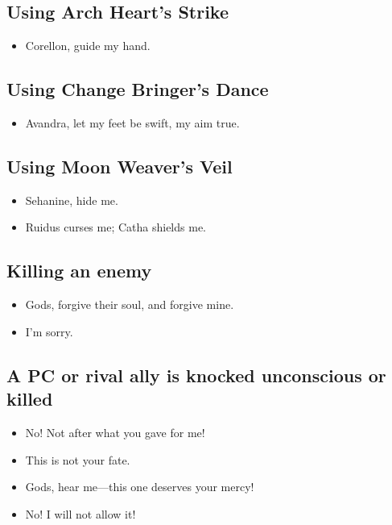 \documentclass[10pt,a4paper,bg=print,twocolumn,openany,nodeprecatedcode]{dndarticle}
\begin{document}
\subsection*{Using Arch Heart's Strike}
\begin{itemize}
  \item Corellon, guide my hand.
\end{itemize}

\subsection*{Using Change Bringer's Dance}
\begin{itemize}
  \item Avandra, let my feet be swift, my aim true.
\end{itemize}

\subsection*{Using Moon Weaver's Veil}
\begin{itemize}
  \item Sehanine, hide me.
  \item Ruidus curses me; Catha shields me.
\end{itemize}

\subsection*{Killing an enemy}
\begin{itemize}
  \item Gods, forgive their soul, and forgive mine.
  \item I'm sorry.
\end{itemize}

\subsection*{A PC or rival ally is knocked unconscious or killed}
\begin{itemize}
  \item No! Not after what you gave for me!
  \item This is not your fate.
  \item Gods, hear me—this one deserves your mercy!
  \item No! I will not allow it!
\end{itemize}
\end{document}
